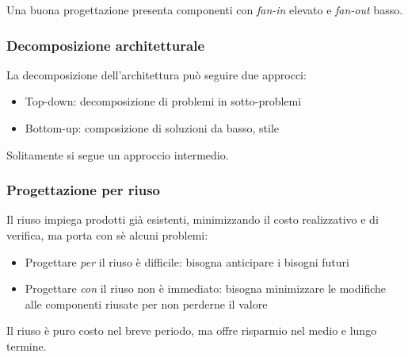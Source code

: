 
Una buona progettazione presenta componenti con \emph{fan-in} elevato e
\emph{fan-out} basso.

\subsubsection{Decomposizione architetturale}

La decomposizione dell'architettura può seguire due approcci:

\begin{itemize}
  \item Top-down: decomposizione di problemi in sotto-problemi
  \item Bottom-up: composizione di soluzioni da basso, stile 
\end{itemize}

Solitamente si segue un approccio intermedio.

\subsubsection{Progettazione per riuso}

Il riuso impiega prodotti già esistenti, minimizzando il costo realizzativo e di
verifica, ma porta con sè alcuni problemi:

\begin{itemize}
  \item Progettare \emph{per} il riuso è difficile: bisogna anticipare i bisogni
        futuri
  \item Progettare \emph{con} il riuso non è immediato: bisogna minimizzare le
        modifiche alle componenti riusate per non perderne il valore
\end{itemize}

Il riuso è puro costo nel breve periodo, ma offre risparmio nel medio e lungo
termine.
